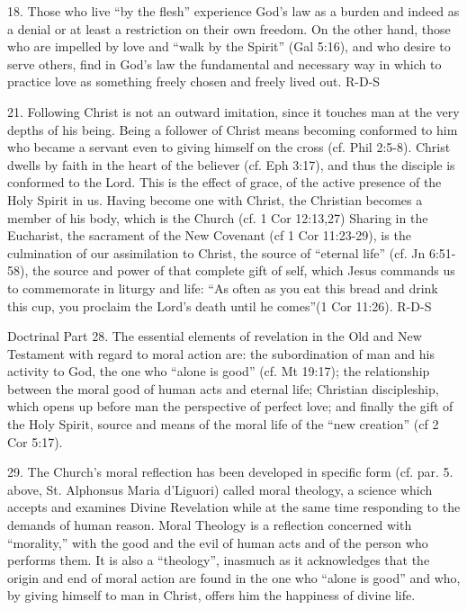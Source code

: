 \documentclass[oneside]{book}
\begin{document}
18. Those who live ``by the flesh'' experience God's law as a burden and indeed
as a denial or at least a restriction on their own freedom. On the other hand,
those who are impelled by love and ``walk by the Spirit'' (Gal 5:16), and who
desire to serve others, find in God's law the fundamental and necessary way in
which to practice love as something freely chosen and freely lived out.
R-D-S

21. Following Christ is not an outward imitation, since it touches man at the
very depths of his being. Being a follower of Christ means becoming conformed to
him who became a servant even to giving himself on the cross (cf. Phil
2:5-8). Christ dwells by faith in the heart of the believer (cf. Eph 3:17), and
thus the disciple is conformed to the Lord. This is the effect of grace, of the
active presence of the Holy Spirit in us. Having become one with Christ, the
Christian
becomes a member of his body, which is the Church (cf. 1 Cor 12:13,27) Sharing
in the Eucharist, the sacrament of the New Covenant (cf 1 Cor 11:23-29), is the
culmination of our assimilation to Christ, the source of ``eternal life''
(cf. Jn 6:51-58), the source and power of that complete gift of self, which
Jesus commands us to commemorate in liturgy and life: ``As often as you eat this
bread and drink this cup, you proclaim the Lord's death until he comes''(1 Cor
11:26).
R-D-S

Doctrinal Part
28. The essential elements of revelation in the Old and New Testament with
regard to moral action are: the subordination of man and his activity to God,
the one who ``alone is good'' (cf. Mt 19:17); the relationship between the moral
good of human acts and eternal life; Christian discipleship, which opens up
before man the perspective of perfect love; and finally the gift of the Holy
Spirit, source and means of the moral life of the ``new creation'' (cf 2 Cor
5:17).

29. The Church's moral reflection has been developed in specific form
(cf. par. 5. above, St. Alphonsus Maria d'Liguori) called moral theology, a
science which accepts and examines Divine Revelation while at the same time
responding to the demands of human reason. Moral Theology is a reflection
concerned with ``morality,'' with the good and the evil of human acts and of the
person who performs them. It is also a ``theology'', inasmuch as it acknowledges
that the origin and end of moral action are found in the one who ``alone is
good'' and who, by giving himself to man in Christ, offers him the happiness of
divine life.
\end{document}
